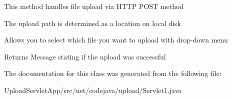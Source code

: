\begin{DoxyItemize}
\item This method handles file upload via H\+T\+T\+P P\+O\+S\+T method
\item The upload path is determined as a location on local disk
\item Allows you to select which file you want to upload with drop-\/down menu \begin{DoxyReturn}{Returns}
Message stating if the upload was successful 
\end{DoxyReturn}

\end{DoxyItemize}

The documentation for this class was generated from the following file\+:\begin{DoxyCompactItemize}
\item 
Upload\+Servlet\+App/src/net/codejava/upload/Servlet1.\+java\end{DoxyCompactItemize}
